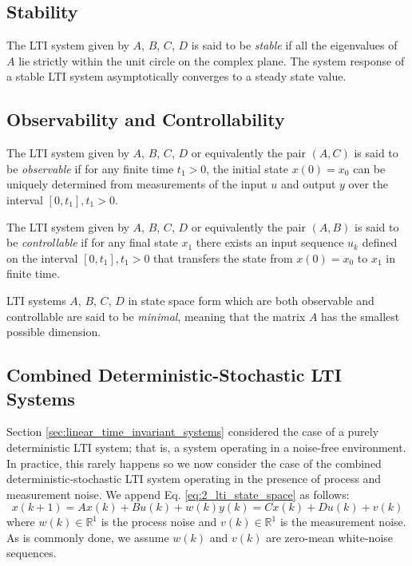 \subsection{Stability}
The LTI system given by $A$, $B$, $C$, $D$ is said to be \textit{stable} if all the eigenvalues of $A$ lie strictly within the unit circle on the complex plane. The system response of a stable LTI system asymptotically converges to a steady state value.

\subsection{Observability and Controllability}
The LTI system given by $A$, $B$, $C$, $D$ or equivalently the pair $(A,C)$ is said to be \textit{observable} if for any finite time $t_1 > 0$, the initial state $x(0) = x_0$ can be uniquely determined from measurements of the input $u$ and output $y$ over the interval $[0, t_1], t_1>0$.

The LTI system given by $A$, $B$, $C$, $D$ or equivalently the pair $(A,B)$ is said to be \textit{controllable} if for any final state $x_1$ there exists an input sequence $u_k$ defined on the interval $[0, t_1], t_1>0$ that transfers the state from $x(0) = x_0$ to $x_1$ in finite time.

LTI systems $A$, $B$, $C$, $D$ in state space form which are both observable and controllable are said to be \textit{minimal}, meaning that the matrix $A$ has the smallest possible dimension.

\subsection{Combined Deterministic-Stochastic LTI Systems}
Section \ref{sec:linear_time_invariant_systems} considered the case of a purely deterministic LTI system; that is, a system operating in a noise-free environment. In practice, this rarely happens so we now consider the case of the combined deterministic-stochastic LTI system operating in the presence of process and measurement noise. We append Eq. \ref{eq:2_lti_state_space} as follows:
\begin{subequations}\label{eq:2_lti_noise}
\begin{equation}x(k+1) = Ax(k) + Bu(k) + w(k)\end{equation}
\begin{equation}y(k) = Cx(k) + Du(k) + v(k)\end{equation}
\end{subequations}
where $w(k)\in\mathbb{R}^1$ is the process noise and $v(k)\in\mathbb{R}^1$ is the measurement noise. As is commonly done, we assume $w(k)$ and $v(k)$ are zero-mean white-noise sequences. 

